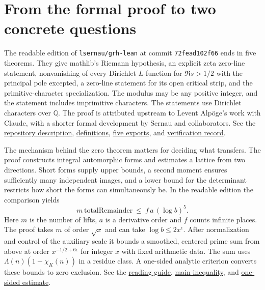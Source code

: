 \documentclass[11pt]{article}
\newcommand{\upstream}[2]{\href{https://github.com/lsernau/grh-lean/blob/72fead102f663d5c7a407964a13dc0cf9d977207/#1}{#2}}
\begin{document}
\tableofcontents
\newpage
\section{From the formal proof to two concrete questions}
The readable edition of \texttt{lsernau/grh-lean} at commit \texttt{72fead102f66} ends in five theorems. They give mathlib's Riemann hypothesis, an explicit zeta zero-line statement, nonvanishing of every Dirichlet $L$-function for $\Re s>1/2$ with the principal pole excepted, a zero-line statement for its open critical strip, and the primitive-character specialization. The modulus may be any positive integer, and the statement includes imprimitive characters. The statements use Dirichlet characters over $\mathbb Q$. The proof is attributed upstream to Levent Alp\"oge's work with Claude, with a shorter formal development by Sernau and collaborators. See the \upstream{README.md}{repository description}, \upstream{grh/src/Statements.lean}{definitions}, \upstream{grh/src/Main.lean}{five exports}, and \upstream{grh/README.md}{verification record}.

The mechanism behind the zero theorem matters for deciding what transfers. The proof constructs integral automorphic forms and estimates a lattice from two directions. Short forms supply upper bounds, a second moment ensures sufficiently many independent images, and a lower bound for the determinant restricts how short the forms can simultaneously be. In the readable edition the comparison yields
\[
        m\,\mathrm{totalRemainder}\ \le\ f\,a\,(\log b)^5.
\]
Here $m$ is the number of lifts, $a$ is a derivative order and $f$ counts infinite places. The proof takes $m$ of order $\sqrt{x}$ and can take $\log b\le2x^\epsilon$. After normalization and control of the auxiliary scale it bounds a smoothed, centered prime sum from above at order $x^{-1/2+6\epsilon}$ for integer $x$ with fixed arithmetic data. The sum uses $\Lambda(n)(1-\chi_K(n))$ in a residue class. A one-sided analytic criterion converts these bounds to zero exclusion. See the \upstream{grh/GUIDE.md}{reading guide}, \upstream{grh/src/New/Reduction/MainInequality.lean}{main inequality}, and \upstream{grh/src/New/Reduction/OneSidedBound.lean}{one-sided estimate}.
\end{document}
